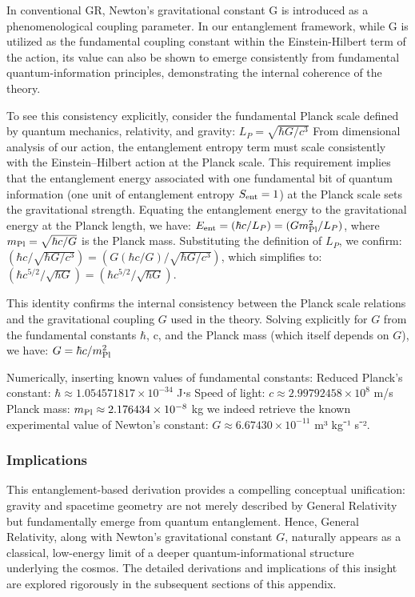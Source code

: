 \documentclass[11pt]{article}
\begin{document}
In conventional GR, Newton's gravitational constant G is introduced as a phenomenological coupling parameter. In our entanglement framework, while G is utilized as the fundamental coupling constant within the Einstein-Hilbert term of the action, its value can also be shown to emerge consistently from fundamental quantum-information principles, demonstrating the internal coherence of the theory.

To see this consistency explicitly, consider the fundamental Planck scale defined by quantum mechanics, relativity, and gravity: $L_P = \sqrt{\hbar G / c^3}$
From dimensional analysis of our action, the entanglement entropy term must scale consistently with the Einstein–Hilbert action at the Planck scale. This requirement implies that the entanglement energy associated with one fundamental bit of quantum information (one unit of entanglement entropy $S_{\rm ent} = 1$) at the Planck scale sets the gravitational strength. Equating the entanglement energy to the gravitational energy at the Planck length, we have: $E_{\rm ent} = (\hbar c / L_P) = (G m_{\rm Pl}^2 / L_P)$, where $m_{\rm Pl} = \sqrt{\hbar c / G}$ is the Planck mass. Substituting the definition of $L_P$, we confirm: $(\hbar c / \sqrt{\hbar G / c^3}) = (G (\hbar c / G) / \sqrt{\hbar G / c^3})$, which simplifies to: $(\hbar c^{5/2} / \sqrt{\hbar G}) = (\hbar c^{5/2} / \sqrt{\hbar G})$.

This identity confirms the internal consistency between the Planck scale relations and the gravitational coupling $G$ used in the theory. Solving explicitly for $G$ from the fundamental constants $\hbar$, c, and the Planck mass (which itself depends on $G$), we have: $G = \hbar c / m_{\rm Pl}^2$

Numerically, inserting known values of fundamental constants: Reduced Planck's constant: $\hbar \approx 1.054571817 \times 10^{-34}$ J⋅s Speed of light: $c \approx 2.99792458 \times 10^8$ m/s Planck mass: $m_{\rm Pl} \approx 2.176434 \times 10^{-8}$ kg we indeed retrieve the known experimental value of Newton's constant: $G \approx 6.67430 \times 10^{-11}$ m³ kg⁻¹ s⁻².

\subsubsection*{Implications}

This entanglement-based derivation provides a compelling conceptual unification: gravity and spacetime geometry are not merely described by General Relativity but fundamentally emerge from quantum entanglement. Hence, General Relativity, along with Newton's gravitational constant $G$, naturally appears as a classical, low-energy limit of a deeper quantum-informational structure underlying the cosmos. The detailed derivations and implications of this insight are explored rigorously in the subsequent sections of this appendix.
\end{document}
